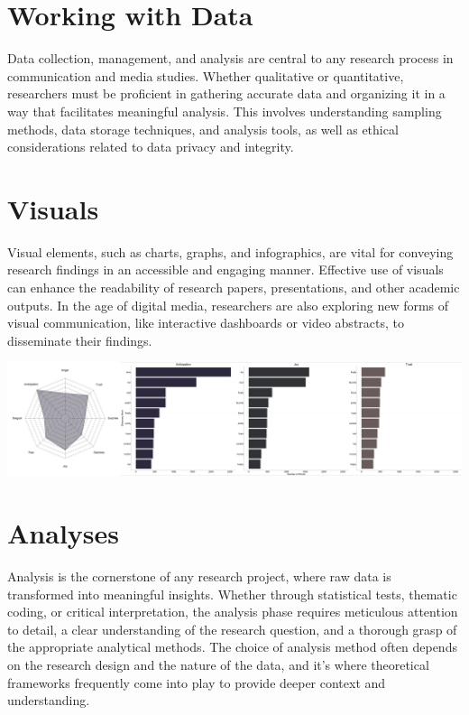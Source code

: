 \documentclass[
  b5paper]{book}
\begin{document}
\hypertarget{working-with-data}{%
\section*{Working with Data}\label{working-with-data}}

Data collection, management, and analysis are central to any research process in communication and media studies. Whether qualitative or quantitative, researchers must be proficient in gathering accurate data and organizing it in a way that facilitates meaningful analysis. This involves understanding sampling methods, data storage techniques, and analysis tools, as well as ethical considerations related to data privacy and integrity.

\hypertarget{visuals}{%
\section*{Visuals}\label{visuals}}

Visual elements, such as charts, graphs, and infographics, are vital for conveying research findings in an accessible and engaging manner. Effective use of visuals can enhance the readability of research papers, presentations, and other academic outputs. In the age of digital media, researchers are also exploring new forms of visual communication, like interactive dashboards or video abstracts, to disseminate their findings.

\includegraphics[width=1\textwidth,height=\textheight]{images/VR-Play-Emotion-MP.png}

\hypertarget{analyses}{%
\section*{Analyses}\label{analyses}}

Analysis is the cornerstone of any research project, where raw data is transformed into meaningful insights. Whether through statistical tests, thematic coding, or critical interpretation, the analysis phase requires meticulous attention to detail, a clear understanding of the research question, and a thorough grasp of the appropriate analytical methods. The choice of analysis method often depends on the research design and the nature of the data, and it's where theoretical frameworks frequently come into play to provide deeper context and understanding.
\end{document}
